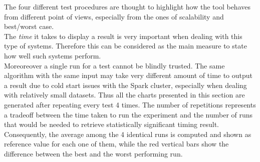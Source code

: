\documentclass{sig-alternate-05-2015}
\begin{document}
The four different test procedures are thought to highlight how the tool behaves from different point of views, especially from the ones of scalability and best/worst case.\\
The \emph{time} it takes to display a result is very important when dealing with this type of systems. Therefore this can be considered as the main measure to state how well such systems perform.\\
Moreoreover a single run for a test cannot be blindly trusted. The same algorithm with the same input may take very different amount of time to output a result due to cold start issues with the Spark cluster, especially when dealing with relatively small datasets. Thus all the charts presented in this section are generated after repeating every test 4 times. The number of repetitions represents a tradeoff between the time taken to run the experiment and the number of runs that would be needed to retrieve statistically significant timing result. Consequently, the average among the 4 identical runs is computed and shown as reference value for each one of them, while the red vertical bars show the difference between the best and the worst performing run.\\
\end{document}
